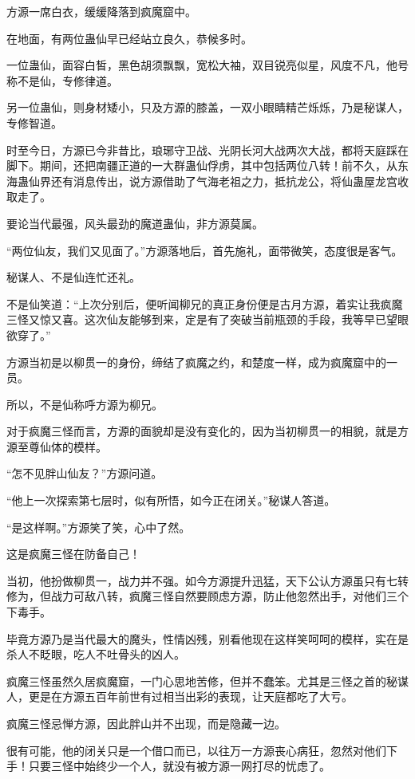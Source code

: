 
\begin{this_body}

方源一席白衣，缓缓降落到疯魔窟中。

在地面，有两位蛊仙早已经站立良久，恭候多时。

一位蛊仙，面容白皙，黑色胡须飘飘，宽松大袖，双目锐亮似星，风度不凡，他号称不是仙，专修律道。

另一位蛊仙，则身材矮小，只及方源的膝盖，一双小眼睛精芒烁烁，乃是秘谋人，专修智道。

时至今日，方源已今非昔比，琅琊守卫战、光阴长河大战两次大战，都将天庭踩在脚下。期间，还把南疆正道的一大群蛊仙俘虏，其中包括两位八转！前不久，从东海蛊仙界还有消息传出，说方源借助了气海老祖之力，抵抗龙公，将仙蛊屋龙宫收取走了。

要论当代最强，风头最劲的魔道蛊仙，非方源莫属。

“两位仙友，我们又见面了。”方源落地后，首先施礼，面带微笑，态度很是客气。

秘谋人、不是仙连忙还礼。

不是仙笑道：“上次分别后，便听闻柳兄的真正身份便是古月方源，着实让我疯魔三怪又惊又喜。这次仙友能够到来，定是有了突破当前瓶颈的手段，我等早已望眼欲穿了。”

方源当初是以柳贯一的身份，缔结了疯魔之约，和楚度一样，成为疯魔窟中的一员。

所以，不是仙称呼方源为柳兄。

对于疯魔三怪而言，方源的面貌却是没有变化的，因为当初柳贯一的相貌，就是方源至尊仙体的模样。

“怎不见胖山仙友？”方源问道。

“他上一次探索第七层时，似有所悟，如今正在闭关。”秘谋人答道。

“是这样啊。”方源笑了笑，心中了然。

这是疯魔三怪在防备自己！

当初，他扮做柳贯一，战力并不强。如今方源提升迅猛，天下公认方源虽只有七转修为，但战力可敌八转，疯魔三怪自然要顾虑方源，防止他忽然出手，对他们三个下毒手。

毕竟方源乃是当代最大的魔头，性情凶残，别看他现在这样笑呵呵的模样，实在是杀人不眨眼，吃人不吐骨头的凶人。

疯魔三怪虽然久居疯魔窟，一门心思地苦修，但并不蠢笨。尤其是三怪之首的秘谋人，更是在方源五百年前世有过相当出彩的表现，让天庭都吃了大亏。

疯魔三怪忌惮方源，因此胖山并不出现，而是隐藏一边。

很有可能，他的闭关只是一个借口而已，以往万一方源丧心病狂，忽然对他们下手！只要三怪中始终少一个人，就没有被方源一网打尽的忧虑了。


\end{this_body}
